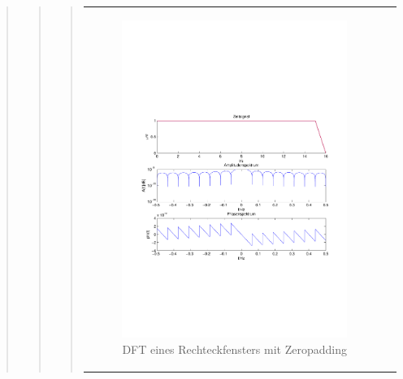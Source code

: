 \begin{quote}
\begin{quote}
\begin{quote}
\begin{center}
\begin{tabular}{ll}
                \hspace{-11em}
                    \begin{minipage}{0.6\textwidth}
    
                        \begin{figure}[H]
                            \label{fig:}
                            \includegraphics[scale=0.5, trim = 1.5cm 7cm 1.5cm 8cm, clip]{./Bilder/RechteckDFTzeropadding} %
                            \caption{DFT eines Rechteckfensters mit Zeropadding}
                        \end{figure}
    
                    \end{minipage}
                    \begin{minipage}{0.6\textwidth}
    

\end{minipage}
\end{tabular}
\end{center}
\end{quote}
\end{quote}
\end{quote}
